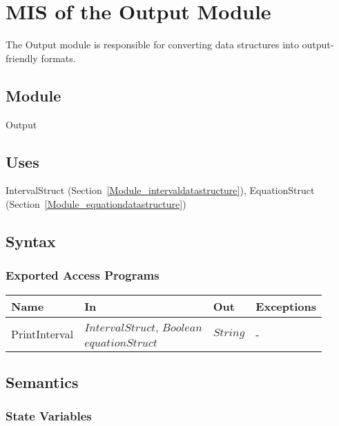 \documentclass[12pt, titlepage]{article}
\begin{document}
\newpage

\section{MIS of the Output Module} 
\label{Module_output}
The Output module is responsible for converting data structures into 
output-friendly formats.

\subsection{Module}

Output

\subsection{Uses}

IntervalStruct (Section~\ref{Module_intervaldatastructure}), EquationStruct 
(Section~\ref{Module_equationdatastructure})

\subsection{Syntax}

\subsubsection{Exported Access Programs}

\begin{center}
	\begin{tabular}{p{3.1cm} p{3cm} p{3cm} p{5cm}}
		\hline
		\textbf{Name} & \textbf{In} & \textbf{Out} & \textbf{Exceptions} \\
		\hline
		\multirow{2}{3.1cm}{PrintInterval} & $IntervalStruct$, $Boolean$ & 
		\multirow{2}{3cm}{$String$} & \multirow{2}{5cm}{-} \\
		PrintEquationTree & $equationStruct$ & $String$ & - \\
		\hline
	\end{tabular}
\end{center}

\subsection{Semantics}

\subsubsection{State Variables}
\end{document}
